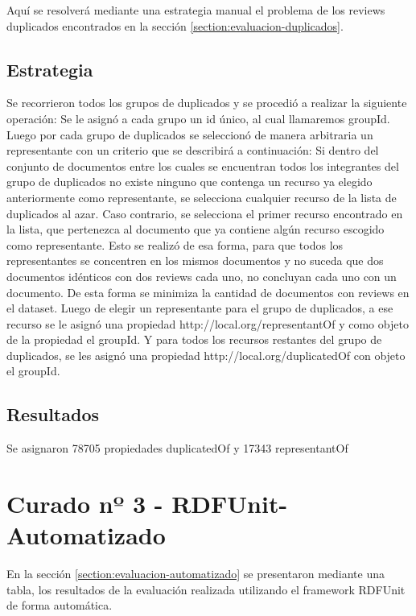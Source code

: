 \noindent Aquí se resolverá mediante una estrategia manual el problema de los reviews duplicados encontrados en la sección \ref{section:evaluacion-duplicados}.

\subsection*{Estrategia}

Se recorrieron todos los grupos de duplicados y se procedió a realizar la siguiente operación:
Se le asignó a cada grupo un id único, al cual llamaremos groupId.
Luego por cada grupo de duplicados se seleccionó de manera arbitraria un representante con un criterio que se describirá a continuación:
Si dentro del conjunto de documentos entre los cuales se encuentran todos los integrantes del grupo de duplicados no existe ninguno 
que contenga un recurso ya elegido anteriormente como representante, se selecciona cualquier recurso de la lista de duplicados al azar.
Caso contrario, se selecciona el primer recurso encontrado en la lista, que pertenezca al documento que ya contiene algún recurso escogido 
como representante.
Esto se realizó de esa forma, para que todos los representantes se concentren en los mismos documentos y no suceda que dos 
documentos idénticos con dos reviews cada uno, no concluyan cada uno con un documento. De esta forma se minimiza la cantidad de 
documentos con reviews en el dataset.
Luego de elegir un representante para el grupo de duplicados, a ese recurso se le asignó una propiedad http://local.org/representantOf y 
como objeto de la propiedad el groupId.
Y para todos los recursos restantes del grupo de duplicados, se les asignó una propiedad http://local.org/duplicatedOf con objeto 
el groupId.

\subsection*{Resultados}

Se asignaron 78705 propiedades duplicatedOf y 17343 representantOf

\section{Curado nº 3 - RDFUnit-Automatizado}
\label{section:curado-automatizado}

\noindent En la sección \ref{section:evaluacion-automatizado} se presentaron mediante una tabla, los resultados de la evaluación realizada
utilizando el framework RDFUnit de forma automática. 

